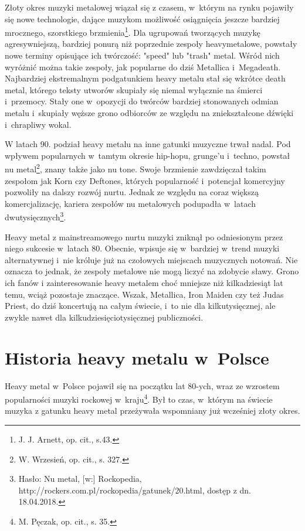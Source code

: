 \documentclass[12pt, a4paper, titlepage]{report}
\begin{document}
Złoty okres muzyki metalowej wiązał się z czasem, w~którym na rynku pojawiły się nowe technologie, dające muzykom możliwość osiągnięcia jeszcze bardziej mrocznego, szorstkiego brzmienia\footnote{J. J. Arnett, op. cit., s.43.}. Dla ugrupowań tworzących muzykę agresywniejszą, bardziej ponurą niż poprzednie zespoły heavymetalowe, powstały nowe terminy opisujące ich twórczość: "speed" lub "trash" metal. Wśród nich wyróżnić można takie zespoły, jak popularne do dziś Metallica i~Megadeath. Najbardziej ekstremalnym podgatunkiem heavy metalu stał się wkrótce death metal, którego teksty utworów skupiały się niemal wyłącznie na śmierci i~przemocy. Stały one w~opozycji do twórców bardziej stonowanych odmian metalu i~skupiały węższe grono odbiorców ze względu na zniekształcone dźwięki i~chrapliwy wokal.

W latach 90. podział heavy metalu na inne gatunki muzyczne trwał nadal. Pod wpływem popularnych w~tamtym okresie hip-hopu, grunge'u i~techno, powstał nu metal\footnote{W. Wrzesień, op. cit., s. 327.}, znany także jako nu tone. Swoje brzmienie zawdzięczał takim zespołom jak Korn czy Deftones, których popularność i~potencjał komercyjny pozwoliły na dalszy rozwój nurtu. Jednak ze względu na coraz większą komercjalizację, kariera zespołów nu metalowych podupadła w~latach dwutysięcznych\footnote{Hasło: Nu metal, [w:] Rockopedia, http://rockers.com.pl/rockopedia/gatunek/20.html, dostęp z dn. 18.04.2018.}. 

Heavy metal z mainstreamowego nurtu muzyki zniknął po odniesionym przez niego sukcesie w~latach 80. Obecnie, wpisuje się w~bardziej w~trend muzyki alternatywnej i~nie króluje już na czołowych miejscach muzycznych notowań. Nie oznacza to jednak, że zespoły metalowe nie mogą liczyć na zdobycie sławy. Grono ich fanów i zainteresowanie heavy metalem choć mniejsze niż kilkadziesiąt lat temu, wciąż pozostaje znaczące. Wszak, Metallica, Iron Maiden czy też Judas Priest, do dziś koncertują na całym świecie, i~to nie dla kilkutysięcznej, ale zwykle nawet dla kilkudziesięciotysięcznej publiczności. 

\section{Historia heavy metalu w~Polsce}
Heavy metal w~Polsce pojawił się na początku lat 80-ych, wraz ze wzrostem popularności muzyki rockowej w~kraju\footnote{M. Pęczak, op. cit., s. 35.}. Był to czas, w~którym na świecie muzyka z gatunku heavy metal przeżywała wspomniany już wcześniej złoty okres. 
\end{document}
